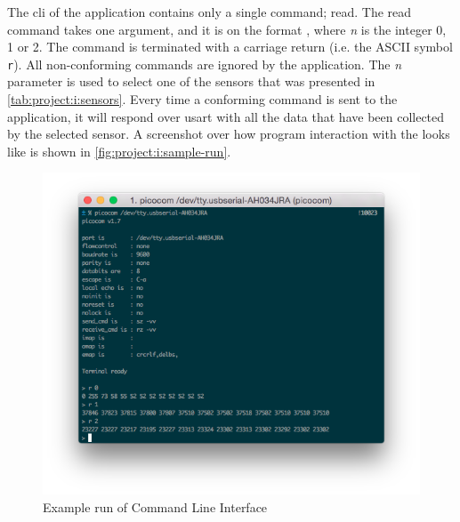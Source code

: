 The \gls{cli} of the application contains only a single command; read.
The read command takes one argument, and it is on the format , where \emph{n} is the integer 0, 1 or 2.
The command is terminated with a carriage return (i.e. the ASCII symbol \texttt{{}r}).
All non-conforming commands are ignored by the application.
The \emph{n} parameter is used to select one of the sensors that was presented in \autoref{tab:project:i:sensors}.
Every time a conforming command is sent to the application, it will respond over \gls{usart} with all the data that have been collected by the selected sensor.
A screenshot over how program interaction with the {\tracker} looks like is shown in \autoref{fig:project:i:sample-run}.

\begin{figure}[H]
  \begin{center}
    \includegraphics[width=\textwidth]{figures/sensortracker-cli}
  \end{center}
  \caption{Example run of Command Line Interface}
  \label{fig:project:i:sample-run}
\end{figure}
